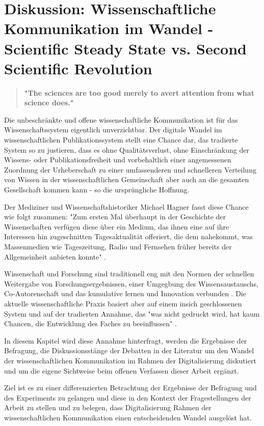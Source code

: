 \chapter{Diskussion: Wissenschaftliche Kommunikation im Wandel - Scientific Steady State vs. Second Scientific Revolution}

\begin{quote}
\textbf{"The sciences are too good merely to avert attention from what science does."}
\end{quote} \cite{kittler_2004}

Die unbeschränkte und offene wissenschaftliche Kommunikation ist für das Wissenschaftssystem eigentlich unverzichtbar. Der digitale Wandel im wissenschaftlichen Publikationssystem stellt eine Chance dar, das tradierte System so zu justieren, dass es ohne Qualitätsverlust, ohne Einschränkung der Wissens- oder Publikationsfreiheit und vorbehaltlich einer angemessenen Zuordnung der Urheberschaft zu einer umfassenderen und schnelleren Verteilung von Wissen in der wissenschaftlichen Gemeinschaft aber auch an die gesamten Gesellschaft kommen kann - so die ursprüngliche Hoffnung.

Der Mediziner und Wissenschaftshistoriker Michael Hagner fasst diese Chance wie folgt zusammen: "Zum ersten Mal überhaupt in der Geschichte der Wissenschaften verfügen diese über ein Medium, das ihnen eine auf ihre Interessen hin zugeschnitten Tagesaktualität offeriert, die dem nahekommt, was Massenmedien wie Tageszeitung, Radio und Fernsehen früher bereits der Allgemeinheit anbieten konnte" \cite{hagner_2015_sache_buches}.

Wissenschaft und Forschung sind traditionell eng mit den Normen der schnellen Weitergabe von Forschungsergebnissen, einer Umgegbung des Wissensaustauschs, Co-Autorenschaft und das kumulative lernen und Innovation verbunden \cite{Partha_1994_economics_science}. Die aktuelle wissenschaftliche Praxis basiert aber auf einem insich geschlossenen System und auf der tradierten Annahme, das "was nicht gedruckt wird, hat kaum Chancen, die Entwicklung des Faches zu beeinflussen" \cite{luhmann_1997_gesellschaft}.

In diesem Kapitel wird diese Annahme hinterfragt, werden die Ergebnisse der Befragung, die Diskussionsstänge der Debatten in der Literatur um den Wandel der wissenschaftlichen Kommunikation im Rahmen der Digitalisierung diskutiert und um die eigene Sichtweise beim offenen Verfassen dieser Arbeit ergänzt.

Ziel ist es zu einer differenzierten Betrachtung der Ergebnisse der Befragung und des Experiments zu gelangen und diese in den Kontext der Fragestellungen der Arbeit zu stellen und zu belegen, dass Digitalisierung Rahmen der wissenschaftlichen Kommunikation einen entscheidenden Wandel ausgelöst hat.

